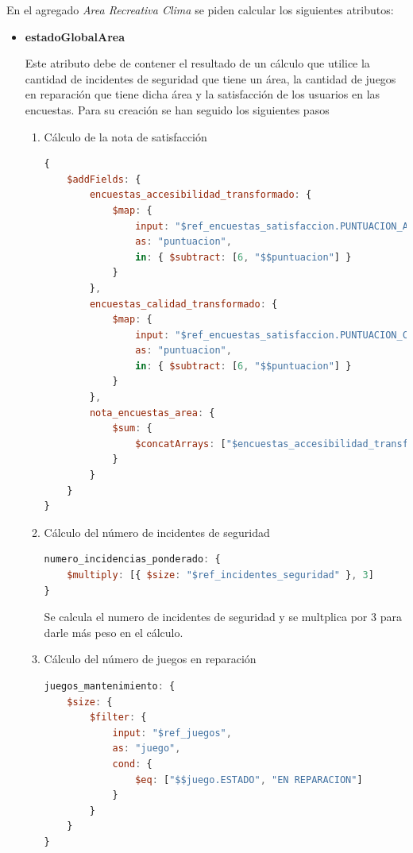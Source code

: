 \documentclass[]{article}
\begin{document}
En el agregado \textit{Area Recreativa Clima} se piden calcular los siguientes atributos:
\begin{itemize}
    \item \textbf{estadoGlobalArea}
    
    Este atributo debe de contener el resultado de un cálculo que utilice la cantidad de incidentes de seguridad que tiene un área, la cantidad de juegos en reparación que tiene dicha área y la satisfacción de los usuarios en las encuestas. Para su creación se han seguido los siguientes pasos
    \begin{enumerate}
        \item Cálculo de la nota de satisfacción
        
        \begin{lstlisting}[language=JavaScript, caption=Calculo del campo nota\_encuestas\_areas]
{
    $addFields: {
        encuestas_accesibilidad_transformado: {
            $map: {
                input: "$ref_encuestas_satisfaccion.PUNTUACION_ACCESIBILIDAD",
                as: "puntuacion",
                in: { $subtract: [6, "$$puntuacion"] }
            }
        },
        encuestas_calidad_transformado: {
            $map: {
                input: "$ref_encuestas_satisfaccion.PUNTUACION_CALIDAD",
                as: "puntuacion",
                in: { $subtract: [6, "$$puntuacion"] }
            }
        },
        nota_encuestas_area: {
            $sum: {
                $concatArrays: ["$encuestas_accesibilidad_transformado", "$encuestas_calidad_transformado"]
            }
        }
    }
}

        \end{lstlisting}

        \item Cálculo del número de incidentes de seguridad
        
        \begin{lstlisting}[language=JavaScript, caption=Ponderación del número de incidencias]
numero_incidencias_ponderado: {
    $multiply: [{ $size: "$ref_incidentes_seguridad" }, 3]
}
        \end{lstlisting}

        Se calcula el numero de incidentes de seguridad y se multplica por 3 para darle más peso en el cálculo.

        \item Cálculo del número de juegos en reparación 
        
        \begin{lstlisting}[caption=Calculo del número de juegos en reparación, language=JavaScript]
juegos_mantenimiento: {
    $size: {
        $filter: {
            input: "$ref_juegos",
            as: "juego",
            cond: {
                $eq: ["$$juego.ESTADO", "EN REPARACION"]
            }
        }
    }
}
        \end{lstlisting}


\end{enumerate}
\end{itemize}
\end{document}
